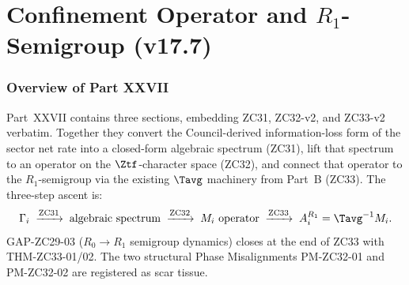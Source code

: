 \documentclass[12pt, a4paper]{article}
\begin{document}
\clearpage

\renewcommand{\tableofcontents}{}


\part{Confinement Operator and \texorpdfstring{$R_1$}{R1}-Semigroup (v17.7)}
\label{part:XXVII}

\section*{Overview of Part XXVII}

Part~XXVII contains three sections, embedding ZC31, ZC32-v2, and
ZC33-v2 verbatim. Together they convert the Council-derived
information-loss form of the sector net rate into a closed-form
algebraic spectrum (ZC31), lift that spectrum to an operator on the
$\Ztf$-character space (ZC32), and connect that operator to the
$R_1$-semigroup via the existing $\Tavg$ machinery from Part~B
(ZC33). The three-step ascent is:
\[
  \Gamma_i \;\xrightarrow{\text{ZC31}}\;
  \text{algebraic spectrum}
  \;\xrightarrow{\text{ZC32}}\;
  M_i \text{ operator}
  \;\xrightarrow{\text{ZC33}}\;
  A_i^{R_1} = \Tavg^{-1} M_i.
\]
GAP-ZC29-03 ($R_0\to R_1$ semigroup dynamics) closes at the end of
ZC33 with THM-ZC33-01/02. The two structural Phase Misalignments
PM-ZC32-01 and PM-ZC32-02 are registered as scar tissue.
\end{document}
